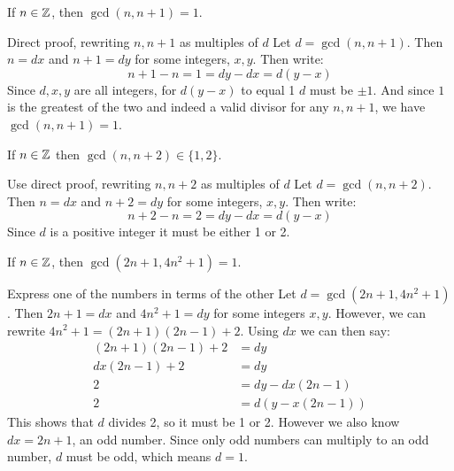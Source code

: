 \documentclass{article}
\begin{document}
\begin{problem}
If $n \in \mathbb{Z}$, then $\gcd(n, n+1) = 1$.
\end{problem}
\begin{solution}{{Direct proof, rewriting $n, n+1$ as multiples of $d$}}
    Let $d = \gcd(n, n+1)$. Then $n = dx$ and $n + 1 = dy$ for some integers, $x, y$. Then write:
    $$n + 1 - n = 1 = dy - dx = d(y - x)$$
    Since $d, x, y$ are all integers, for $d(y - x)$ to equal 1 $d$ must be $\pm1$. And since $1$ is the greatest of the two and indeed a valid divisor for any $n, n+1$, we have $\gcd(n, n+1) = 1$.
\end{solution}
\begin{problem}
If $n \in \mathbb{Z}$ then $\gcd(n, n+2) \in \{1, 2\}$.
\end{problem}
\begin{solution}{{Use direct proof, rewriting $n, n+2$ as multiples of $d$}}
    Let $d = \gcd(n, n+2)$. Then $n = dx$ and $n + 2 = dy$ for some integers, \(x, y\). Then write:
    \[n + 2 - n = 2 = dy - dx = d(y - x)\]
    Since \(d\) is a positive integer it must be either 1 or 2.
\end{solution}

\begin{problem}
If \(n \in \mathbb{Z}\), then \(\gcd(2n+1, 4n^2+1) = 1\).
\end{problem}
\begin{solution}{Express one of the numbers in terms of the other}
    Let \(d = \gcd(2n+1, 4n^2+1)\). Then \(2n+1 = dx\) and \(4n^2+1 = dy\) for some integers \(x, y\). However, we can rewrite \(4n^2 + 1 = (2n+1)(2n-1) +2\). Using \(dx\) we can then say:
    \begin{align*}
        (2n+1)(2n-1) + 2 & = dy             \\
        dx(2n-1) + 2     & = dy             \\
        2                & = dy - dx(2n-1)  \\
        2                & = d(y - x(2n-1))
    \end{align*}
    This shows that \(d\) divides 2, so it must be 1 or 2. However we also know \(dx = 2n + 1\), an odd number. Since only odd numbers can multiply to an odd number, \(d\) must be odd, which means \(d = 1\).
\end{solution}
\end{document}

